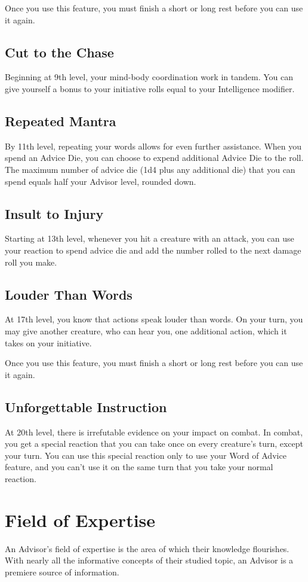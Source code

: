 \documentclass[letterpaper,openany,twoside,twocolumn]{book}
\begin{document}
	Once you use this feature, you must finish a short or long rest before you can use it again.
	
	\subsection*{Cut to the Chase}
	Beginning at 9th level, your mind-body coordination work in tandem. You can give yourself a bonus to your initiative rolls equal to your Intelligence modifier.
	
	\subsection*{Repeated Mantra}
	By 11th level, repeating your words allows for even further assistance. When you spend an Advice Die, you can choose to expend additional Advice Die to the roll. The maximum number of advice die (1d4 plus any additional die) that you can spend equals half your Advisor level, rounded down.
	
	\subsection*{Insult to Injury}
	Starting at 13th level, whenever you hit a creature with an attack, you can use your reaction to spend advice die and add the number rolled to the next damage roll you make.
	
	\subsection*{Louder Than Words}
	At 17th level, you know that actions speak louder than words. On your turn, you may give another creature, who can hear you, one additional action, which it takes on your initiative.
	
	Once you use this feature, you must finish a short or long rest before you can use it again.
	
	\subsection*{Unforgettable Instruction}
	At 20th level, there is irrefutable evidence on your impact on combat. In combat, you get a special reaction that you can take once on every creature’s turn, except your turn. You can use this special reaction only to use your Word of Advice feature, and you can’t use it on the same turn that you take your normal reaction.
	
	\section*{Field of Expertise}
	An Advisor's field of expertise is the area of which their knowledge flourishes. With nearly all the informative concepts of their studied topic, an Advisor is a premiere source of information.
	
\end{document}
